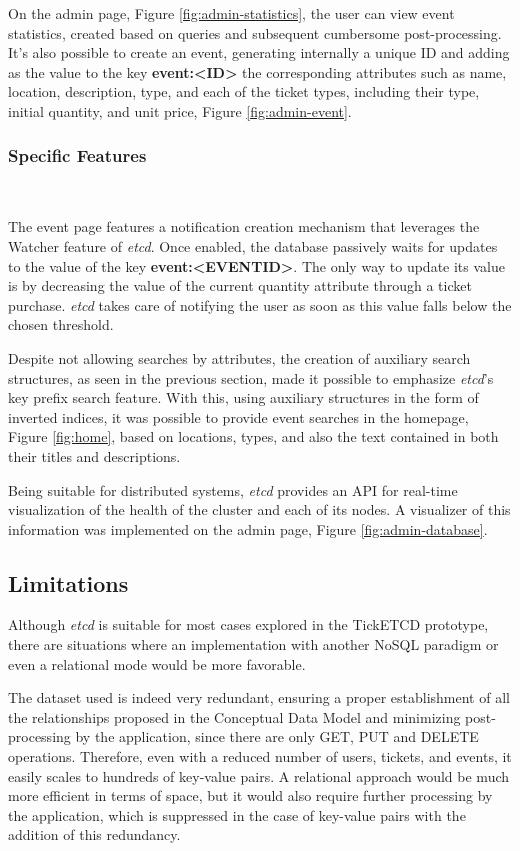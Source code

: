 \documentclass[screen,review]{acmart}
\begin{document}
On the admin page, Figure \ref{fig:admin-statistics}, the user can view event statistics, created based on queries and subsequent cumbersome post-processing. It's also possible to create an event, generating internally a unique ID and adding as the value to the key \textbf{event:<ID>} the corresponding attributes such as name, location, description, type, and each of the ticket types, including their type, initial quantity, and unit price, Figure \ref{fig:admin-event}. \\

\subsubsection{Specific Features}~\

The event page features a notification creation mechanism that leverages the Watcher feature of \textit{etcd}. Once enabled, the database passively waits for updates to the value of the key \textbf{event:<EVENTID>}. The only way to update its value is by decreasing the value of the current quantity attribute through a ticket purchase. \textit{etcd} takes care of notifying the user as soon as this value falls below the chosen threshold.

Despite not allowing searches by attributes, the creation of auxiliary search structures, as seen in the previous section, made it possible to emphasize \textit{etcd}'s key prefix search feature. With this, using auxiliary structures in the form of inverted indices, it was possible to provide event searches in the homepage, Figure \ref{fig:home}, based on locations, types, and also the text contained in both their titles and descriptions.

Being suitable for distributed systems, \textit{etcd} provides an API for real-time visualization of the health of the cluster and each of its nodes. A visualizer of this information was implemented on the admin page, Figure \ref{fig:admin-database}.

\subsection{Limitations}
Although \textit{etcd} is suitable for most cases explored in the TickETCD prototype, there are situations where an implementation with another NoSQL paradigm or even a relational mode would be more favorable.

The dataset used is indeed very redundant, ensuring a proper establishment of all the relationships proposed in the Conceptual Data Model and minimizing post-processing by the application, since there are only GET, PUT and DELETE operations. Therefore, even with a reduced number of users, tickets, and events, it easily scales to hundreds of key-value pairs. A relational approach would be much more efficient in terms of space, but it would also require further processing by the application, which is suppressed in the case of key-value pairs with the addition of this redundancy.
\end{document}
